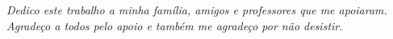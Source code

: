 \begin{dedicatoria}
   \vspace*{\fill}
   \centering
   \noindent
   \textit{Dedico este trabalho a minha família, amigos e professores que me apoiaram. Agradeço a todos pelo apoio e também me agradeço por não desistir.} \vspace*{\fill}
\end{dedicatoria}
